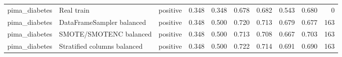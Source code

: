 \begin{table}
\begin{adjustbox}{max width=\textwidth}
\begin{tabular}{lllrrrrrrr}
pima\_diabetes & Real train & positive & 0.348 & 0.348 & 0.678 & 0.682 & 0.543 & 0.680 & 0 \\
pima\_diabetes & DataFrameSampler balanced & positive & 0.348 & 0.500 & 0.720 & 0.713 & 0.679 & 0.677 & 163 \\
pima\_diabetes & SMOTE/SMOTENC balanced & positive & 0.348 & 0.500 & 0.713 & 0.708 & 0.667 & 0.703 & 163 \\
pima\_diabetes & Stratified columns balanced & positive & 0.348 & 0.500 & 0.722 & 0.714 & 0.691 & 0.690 & 163 \\
\bottomrule
\end{tabular}
\end{adjustbox}
\end{table}
